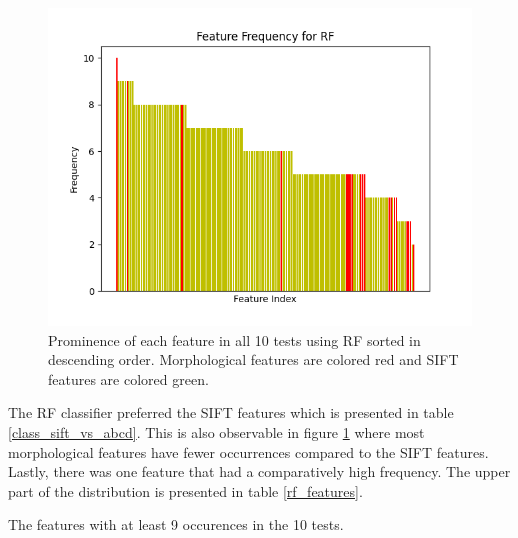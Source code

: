 \documentclass{kththesis}
\begin{document}
\begin{figure}[h!]
  \centering
  \includegraphics[scale=0.8]{figures/rf_all_freqs.png}
  \caption{Prominence of each feature in all 10 tests using RF sorted in descending order. Morphological features are colored red and SIFT features are colored green.}
  \label{fig:freqs_rf}
\end{figure}

The RF classifier preferred the SIFT features which is presented in table \ref{class_sift_vs_abcd}. This is also observable in figure \ref{fig:freqs_rf} where most morphological features have fewer occurrences compared to the SIFT features. Lastly, there was one feature that had a comparatively high frequency. The upper part of the distribution is presented in table \ref{rf_features}.

\newpage

\begin{table}[h!]
  \caption{The features with at least 9 occurences in the 10 tests.}
  \begin{center}
  \end{center}
  \label{rf_features}
\end{table}
\end{document}
